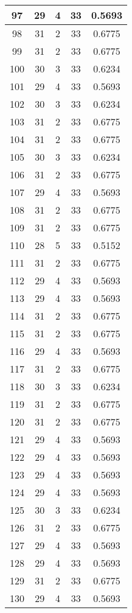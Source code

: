 \documentclass[letterpaper, 12pt]{article}
\begin{document}
\begin{longtable}{|c|c|c|c|c|}
\hline
97 & 29 & 4 & 33 & 0.5693 \\
\hline
98 & 31 & 2 & 33 & 0.6775 \\
\hline
99 & 31 & 2 & 33 & 0.6775 \\
\hline
100 & 30 & 3 & 33 & 0.6234 \\
\hline
101 & 29 & 4 & 33 & 0.5693 \\
\hline
102 & 30 & 3 & 33 & 0.6234 \\
\hline
103 & 31 & 2 & 33 & 0.6775 \\
\hline
104 & 31 & 2 & 33 & 0.6775 \\
\hline
105 & 30 & 3 & 33 & 0.6234 \\
\hline
106 & 31 & 2 & 33 & 0.6775 \\
\hline
107 & 29 & 4 & 33 & 0.5693 \\
\hline
108 & 31 & 2 & 33 & 0.6775 \\
\hline
109 & 31 & 2 & 33 & 0.6775 \\
\hline
110 & 28 & 5 & 33 & 0.5152 \\
\hline
111 & 31 & 2 & 33 & 0.6775 \\
\hline
112 & 29 & 4 & 33 & 0.5693 \\
\hline
113 & 29 & 4 & 33 & 0.5693 \\
\hline
114 & 31 & 2 & 33 & 0.6775 \\
\hline
115 & 31 & 2 & 33 & 0.6775 \\
\hline
116 & 29 & 4 & 33 & 0.5693 \\
\hline
117 & 31 & 2 & 33 & 0.6775 \\
\hline
118 & 30 & 3 & 33 & 0.6234 \\
\hline
119 & 31 & 2 & 33 & 0.6775 \\
\hline
120 & 31 & 2 & 33 & 0.6775 \\
\hline
121 & 29 & 4 & 33 & 0.5693 \\
\hline
122 & 29 & 4 & 33 & 0.5693 \\
\hline
123 & 29 & 4 & 33 & 0.5693 \\
\hline
124 & 29 & 4 & 33 & 0.5693 \\
\hline
125 & 30 & 3 & 33 & 0.6234 \\
\hline
126 & 31 & 2 & 33 & 0.6775 \\
\hline
127 & 29 & 4 & 33 & 0.5693 \\
\hline
128 & 29 & 4 & 33 & 0.5693 \\
\hline
129 & 31 & 2 & 33 & 0.6775 \\
\hline
130 & 29 & 4 & 33 & 0.5693 \\

\end{longtable}
\end{document}
